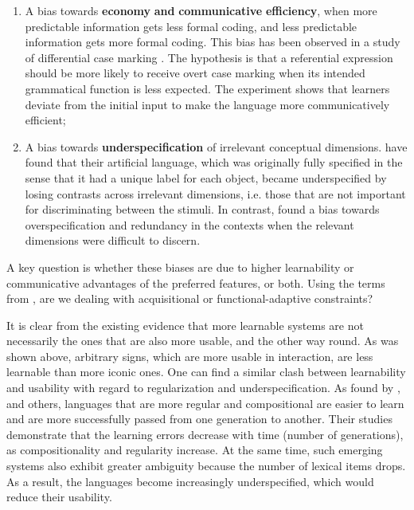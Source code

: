 \documentclass[output=paper]{langsci/langscibook}
\begin{document}
\begin{enumerate}
\item 
A bias towards \textbf{economy} \textbf{and} \textbf{communicative} \textbf{efficiency}, when more predictable information gets less formal coding, and less predictable information gets more formal coding. This bias has been observed in a study of differential case marking \citep{FedzechkinaEtAl2012}. The hypothesis is that a referential expression should be more likely to receive overt case marking when its intended grammatical function is less expected. The experiment shows that learners deviate from the initial input to make the language more communicatively efficient;
\item 
A bias towards \textbf{underspecification} of irrelevant conceptual dimensions. \citet{SilveyEtAl2015} have found that their artificial language, which was originally fully specified in the sense that it had a unique label for each object, became underspecified by losing contrasts across irrelevant dimensions, i.e. those that are not important for discriminating between the stimuli. In contrast, \citet{TinitsEtAl2017} found a bias towards overspecification and redundancy in the contexts when the relevant dimensions were difficult to discern.  
\end{enumerate}

A key question is whether these biases are due to higher learnability or communicative advantages of the preferred features, or both. Using the terms from \citet{Haspelmath2019 (this volume)}, are we dealing with acquisitional or functional-adaptive constraints? 

It is clear from the existing evidence that more learnable systems are not necessarily the ones that are also more usable, and the other way round. As was shown above, arbitrary signs, which are more usable in interaction, are less learnable than more iconic ones. One can find a similar clash between learnability and usability with regard to regularization and underspecification. As found by \citet{KirbyEtAl2008}, \citet{Verhoef2012} and others, languages that are more regular and compositional are easier to learn and are more successfully passed from one generation to another. Their studies demonstrate that the learning errors decrease with time (number of generations), as compositionality and regularity increase. At the same time, such emerging systems also exhibit greater ambiguity because the number of lexical items drops. As a result, the languages become increasingly underspecified, which would reduce their usability. 
\end{document}
